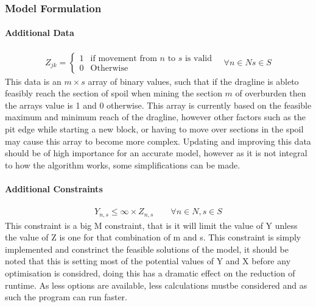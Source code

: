 \subsubsection{Model Formulation}
\paragraph*{Additional Data}

\begin{align}
\label{MIP:Data Valid}
Z_{jk}  = \begin{cases} 1& \text{if movement from $n$ to $s$ is valid}\\
0 & \text{Otherwise}   \end{cases} 
\quad \forall n \in N s\in S
\end{align}
This data is an $m\times s$ array of binary values, such that if the dragline is ableto feasibly reach the section of spoil when mining the section $m$ of overburden then the arrays value is 1 and 0 otherwise. This array is currently based on the feasible  maximum and minimum reach of the dragline, however other factors such as the pit edge while starting a new block, or having to move over sections in the spoil may cause this array to become more complex. Updating and improving this data should be of high importance for an accurate model, however as it is not integral to how the algorithm works, some simplifications can be made.
\paragraph*{Additional Constraints}
\begin{align}
\label{MIP:Valid}
Y_{n,s}\leq \infty\times Z_{n,s} \qquad \forall n \in N , s\in S
\end{align}
This constraint is a big M constraint, that is it will limit the value of Y unless the value of Z is one for that combination of m and s. This constraint is simply implemented and constrinct the feasible solutions of the model, it should be noted that this is setting most of the potential values of Y and X before any optimisation is considred, doing this has a dramatic effect on the reduction of runtime. As less options are available, less calculations mustbe considered and as such the program can run faster.
